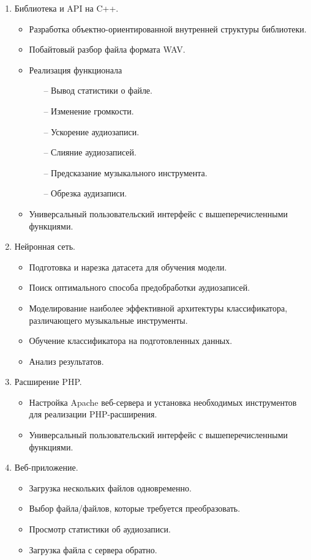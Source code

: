 \documentclass[14pt,a4paper]{article}
\begin{document}
\begin{enumerate}
\item Библиотека и API на C++.
    \begin{itemize}
    \item Разработка объектно-ориентированной внутренней структуры библиотеки.
    \item Побайтовый разбор файла формата WAV.
    \item Реализация функционала
        \begin{itemize}
        \item[--] Вывод статистики о файле.
        \item[--] Изменение громкости.
        \item[--] Ускорение аудиозаписи.
        \item[--] Слияние аудиозаписей.
        \item[--] Предсказание музыкального инструмента.
        \item[--] Обрезка аудизаписи.
        \end{itemize}
    \item Универсальный пользовательский интерфейс с вышеперечисленными функциями.
    \end{itemize}
\item Нейронная сеть.
    \begin{itemize}
    \item Подготовка и нарезка датасета для обучения модели. 
    \item Поиск оптимального способа предобработки аудиозаписей.
    \item Моделирование наиболее эффективной архитектуры классификатора, различающего музыкальные инструменты.
    \item Обучение классификатора на подготовленных данных.
    \item Анализ результатов.
    \end{itemize}
\item Расширение PHP.
    \begin{itemize}
    \item Настройка Apache веб-сервера и установка необходимых инструментов для реализации PHP-расширения.
    \item Универсальный пользовательский интерфейс с вышеперечисленными функциями.
    \end{itemize}
\item Веб-приложение.
    \begin{itemize}
    \item Загрузка нескольких файлов одновременно.
    \item Выбор файла/файлов, которые требуется преобразовать.
    \item Просмотр статистики об аудиозаписи.
    \item Загрузка файла с сервера обратно.
    \end{itemize}
\end{enumerate}
\end{document}
